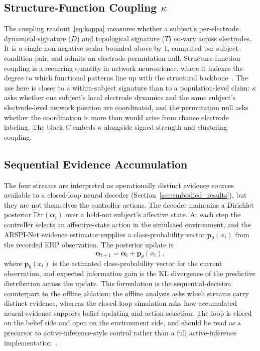 \documentclass[journal]{IEEEtran}
\begin{document}
\subsection{Structure-Function Coupling $\kappa$}
The coupling readout~\eqref{eq:kappa} measures whether a subject's per-electrode dynamical signature ($D$) and topological signature ($T$) co-vary across electrodes. It is a single non-negative scalar bounded above by $1$, computed per subject-condition pair, and admits an electrode-permutation null. Structure-function coupling is a recurring quantity in network neuroscience, where it indexes the degree to which functional patterns line up with the structural backbone~\cite{honey2009structural,park2013structural,suarez2020linking}. The use here is closer to a within-subject signature than to a population-level claim: $\kappa$ asks whether one subject's local electrode dynamics and the same subject's electrode-level network position are coordinated, and the permutation null asks whether the coordination is more than would arise from chance electrode labeling. The block $C$ embeds $\kappa$ alongside signed strength and clustering coupling.

\subsection{Sequential Evidence Accumulation}
The four streams are interpreted as operationally distinct evidence sources available to a closed-loop neural decoder (Section~\ref{sec:embodied_results}), but they are not themselves the controller actions. The decoder maintains a Dirichlet posterior $\mathrm{Dir}(\boldsymbol{\alpha}_t)$ over a held-out subject's affective state. At each step the controller selects an affective-state action in the simulated environment, and the ARSPI-Net evidence estimator supplies a class-probability vector $\mathbf{p}_{\theta}(x_t)$ from the recorded ERP observation. The posterior update is
\begin{equation}
\boldsymbol{\alpha}_{t+1} = \boldsymbol{\alpha}_t + \mathbf{p}_{\theta}(x_t),
\label{eq:dirichlet_update}
\end{equation}
where $\mathbf{p}_{\theta}(x_t)$ is the estimated class-probability vector for the current observation, and expected information gain is the KL divergence of the predictive distribution across the update. This formulation is the sequential-decision counterpart to the offline ablation: the offline analysis asks which streams carry distinct evidence, whereas the closed-loop simulation asks how accumulated neural evidence supports belief updating and action selection. The loop is closed on the belief side and open on the environment side, and should be read as a precursor to active-inference-style control rather than a full active-inference implementation~\cite{friston2010free,parr2022activeinference}.
\end{document}
